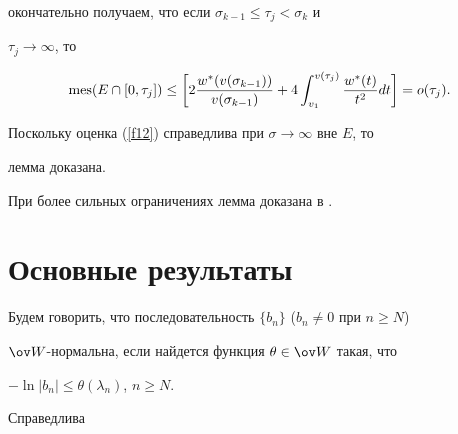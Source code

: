 окончательно получаем, что  если $\sigma_{k-1}\leq\tau_{j}<\sigma_{k}$ и


$\tau_{j}\to\infty$, то


\begin{equation}\label{f20}


\mes(E\cap[0,\tau_{j}])\leq


\bigg[ 2\frac{w^{*}(v(\sigma_{k-1}))}{v(\sigma_{k-1})}


+4\int_{v_{1}}^{v(\tau_{j})}\frac{w^{*}(t)}{t^{2}}dt \bigg]


=o(\tau_{j}).


\end{equation}


Поскольку оценка (\ref{f12}) справедлива при $\sigma\to\infty$ вне $E$, то


лемма доказана.





\begin{note}


При более сильных ограничениях лемма доказана в \cite{lit4}.


\end{note}





\section{Основные результаты}





Будем говорить, что последовательность $\{b_n\}$ ($b_n\ne0$ при $n\ge N$)


$\ov W$-нормальна, если найдется функция $\theta\in\ov W$ такая, что


$-\ln|b_n|\le\theta(\lambda_n)$, $n\ge N$.





Справедлива






